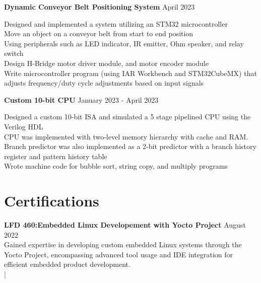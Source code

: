 \documentclass[letter,12pt]{article}
\begin{document}
\vspace{-.5cm}
\begin{tcolorbox}
[colback=gray!25,
  leftrule=0pt,
  rightrule=0pt,
  sharp corners]
\noindent\textbf{Dynamic Conveyor Belt Positioning System} 
  \hfill April 2023 
\end{tcolorbox}
\noindent
\textbullet \- Designed and implemented a system utilizing an STM32 microcontroller \\
\textbullet \- Move an object on a conveyor belt from start to end position \\
\textbullet \- Using peripherals such as LED indicator, IR emitter, Ohm speaker, and relay switch\\
\textbullet \- Design H-Bridge motor driver module, and motor encoder module \\
\textbullet \- Write microcontroller program (using IAR Workbench and STM32CubeMX) 
that adjusts frequency/duty cycle adjustments based on input signals \\

\vspace{-.5cm}

\begin{tcolorbox}
[colback=gray!25,
  leftrule=0pt,
  rightrule=0pt,
  sharp corners]
\textbf{Custom 10-bit CPU} 
\hfill January 2023 - April 2023 
\end{tcolorbox}
\noindent
\textbullet \- Designed a custom 10-bit ISA and simulated a 5 stage pipelined CPU using the Verilog HDL \\
\textbullet \- CPU was implemented with two-level memory hierarchy with cache and RAM. \\
\textbullet \- Branch predictor was also implemented as a 2-bit predictor with a branch history register and
pattern history table\\
\textbullet \- Wrote machine code for bubble sort, string copy, and multiply programs
\vspace{-.75cm}
\section*{Certifications}
\vspace{-.25cm}
\textbf{LFD 460:Embedded Linux Developement with Yocto
Project} \hfill August 2022\\ 
Gained expertise in developing custom embedded Linux systems through the Yocto Project, encompassing advanced tool usage and IDE integration for efficient embedded product development.\\
\href{https://www.credly.com/badges/2a1ad89a-9c46-4145-a715-128f7a8fd1db/public_url}
{} |
\href{https://ti-user-certificates.s3.amazonaws.com/e0df7fbf-a057-42af-8a1f-590912be5460/fcc7abec-e782-4b52-a893-697157cb2e3b-dylan-garza-9cd517ca-cff3-4ee2-898e-4173cb45d893-certificate.pdf}
{}

\vspace{-.5cm}

\end{document}
